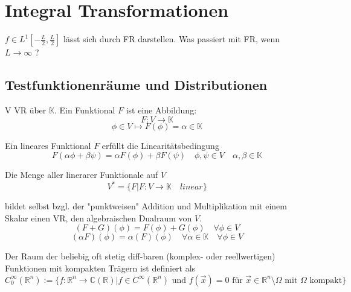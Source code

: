 \section{Integral Transformationen}
    $f \in L^1[-\frac{L}{2}, \frac{L}{2}]$ lässt sich durch
    FR darstellen. Was passiert mit FR, wenn 
    $L \rightarrow \infty$ ?


    \subsection{Testfunktionenräume und Distributionen}

    \begin{Def}
        V VR über $\mathbb{K}$. Ein Funktional $F$ ist eine Abbildung:
        $$F: V \rightarrow \mathbb{K}$$
        $$ \phi \in V \mapsto F(\phi) = \alpha \in \mathbb{K}$$

        Ein lineares Funktional $F$ erfüllt die Linearitätsbedingung
        $$F(\alpha \phi + \beta \psi) = \alpha F(\phi) + \beta F(\psi) \quad \phi , \psi \in V \quad \alpha, \beta \in \mathbb{K} $$

        Die Menge aller linerarer Funktionale auf $V$
        $$V^\ast =  \{ F | F:V \rightarrow \mathbb{K} \quad linear \} $$

        bildet selbst bzgl. der "punktweisen" Addition und Multiplikation
        mit einem Skalar einen VR, den algebraischen Dualraum von $V$.
        $$(F+G)(\phi) = F(\phi) + G(\phi) \quad \forall \phi \in V $$
        $$(\alpha F)(\phi) = \alpha (F)(\phi)  \quad \forall \alpha \in \mathbb{K} \quad \forall \phi \in V $$
    \end{Def}

    \begin{Def}
        Der Raum der beliebig oft stetig diff-baren (komplex- oder 
        reellwertigen) Funktionen mit kompakten Trägern ist definiert als
        $$C_0^\infty (\mathbb{R}^n)  := \{ f:\mathbb{R}^n \rightarrow \mathbb{C}(\mathbb{R}) | f \in C^\infty(\mathbb{R}^n) \textrm{ und } f(\vec{x})=0 \textrm{ für } \vec{x} \in \mathbb{R}^n \setminus  \Omega \textrm{ mit } \Omega \textrm{ kompakt} \}$$
    \end{Def}